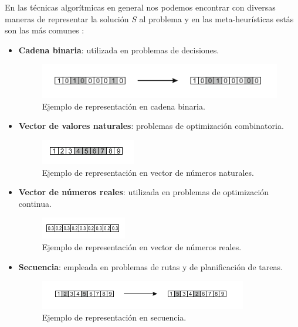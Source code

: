 En las técnicas algorítmicas en general nos podemos encontrar con diversas maneras de representar la solución $S$ al problema y en las meta-heurísticas estás son las más comunes \cite{metaheuristics}:

\bigskip

\begin{itemize}
    \item \textbf{Cadena binaria}: utilizada en problemas de decisiones.
    \begin{figure}[!ht]
    \centering
    \includegraphics[scale=1.2]{images/binaria}
    \caption{Ejemplo de representación en cadena binaria.}
    \end{figure} 
    \item \textbf{Vector de valores naturales}: problemas de optimización combinatoria.
    \begin{figure}[!ht]
    \centering
    \includegraphics[scale=1.2]{images/natural}
    \caption{Ejemplo de representación en vector de números naturales.}
    \end{figure}
    \item \textbf{Vector de números reales}: utilizada en problemas de optimización continua.
    \begin{figure}[!ht]
    \centering
    \includegraphics[scale=1.2]{images/reales}
    \caption{Ejemplo de representación en vector de números reales.}
    \end{figure}
    \item \textbf{Secuencia}: empleada en problemas de rutas y de planificación de tareas.
    \begin{figure}[!ht]
    \centering
    \includegraphics[scale=1.2]{images/secuencia}
    \caption{Ejemplo de representación en secuencia.}
    \end{figure}
\end{itemize}

